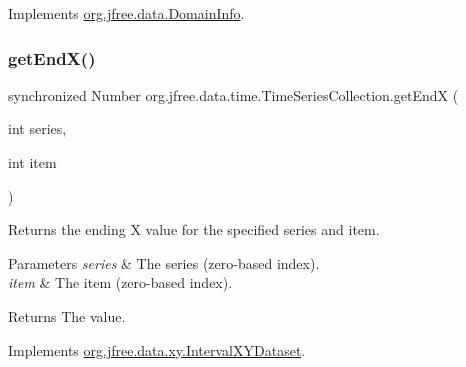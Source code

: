 Implements \mbox{\hyperlink{interfaceorg_1_1jfree_1_1data_1_1_domain_info_a00e455f8db5bd8515266000cacc74e89}{org.\+jfree.\+data.\+Domain\+Info}}.

\mbox{\label{classorg_1_1jfree_1_1data_1_1time_1_1_time_series_collection_a0c6fbda683133ad5e4a0443e93a1cefa}} 
\subsubsection{\texorpdfstring{get\+End\+X()}{getEndX()}}
{\footnotesize\ttfamily synchronized Number org.\+jfree.\+data.\+time.\+Time\+Series\+Collection.\+get\+EndX (\begin{DoxyParamCaption}\item[{int}]{series,  }\item[{int}]{item }\end{DoxyParamCaption})}

Returns the ending X value for the specified series and item.


\begin{DoxyParams}{Parameters}
{\em series} & The series (zero-\/based index). \\
\hline
{\em item} & The item (zero-\/based index).\\
\hline
\end{DoxyParams}
\begin{DoxyReturn}{Returns}
The value. 
\end{DoxyReturn}


Implements \mbox{\hyperlink{interfaceorg_1_1jfree_1_1data_1_1xy_1_1_interval_x_y_dataset_a93161a6d6c1db37cfac030239c62ab0a}{org.\+jfree.\+data.\+xy.\+Interval\+X\+Y\+Dataset}}.

\mbox{\label{classorg_1_1jfree_1_1data_1_1time_1_1_time_series_collection_af7975c0f5e474a5daac76d2313a23f19}} 
